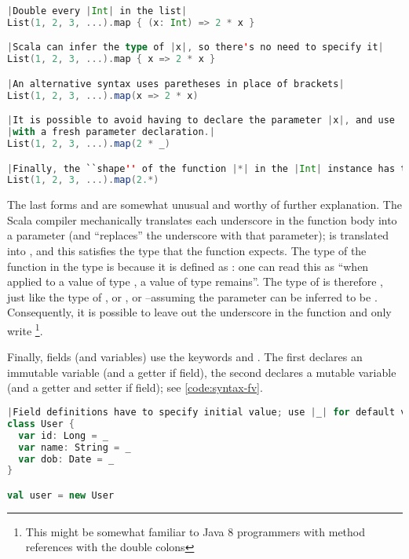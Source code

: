 \documentclass[10 pt]{article}
\begin{document}
\begin{lstlisting}[caption={Fields \& variables}, label={code:syntax-fun}, language=Scala, escapechar=|]
|Double every |Int| in the list|
List(1, 2, 3, ...).map { (x: Int) => 2 * x }

|Scala can infer the type of |x|, so there's no need to specify it|
List(1, 2, 3, ...).map { x => 2 * x }

|An alternative syntax uses paretheses in place of brackets|
List(1, 2, 3, ...).map(x => 2 * x)

|It is possible to avoid having to declare the parameter |x|, and use |_| instead. Scala compiler replaces the every occurrence of |_
|with a fresh parameter declaration.|
List(1, 2, 3, ...).map(2 * _)

|Finally, the ``shape'' of the function |*| in the |Int| instance has the right type, so it can be used directly.|
List(1, 2, 3, ...).map(2.*)
\end{lstlisting}

The last forms  and  are somewhat unusual and worthy of further explanation. The Scala compiler mechanically translates each underscore in the function body into a parameter (and ``replaces'' the underscore with that parameter);  is translated into , and this satisfies the type that the  function expects. The type of the function \pcode{*} in the  type is  because it is defined as : one can read this as ``when applied to a value of type , a value of type  remains''. The type of  is therefore , just like the type of , or , or --assuming the parameter can be inferred to be . Consequently, it is possible to leave out the underscore in the  function and only write \footnote{This might be somewhat familiar to Java 8 programmers with method references with the double colons}.

Finally, fields (and variables) use the keywords  and . The first declares an immutable variable (and a getter if field), the second declares a mutable variable (and a getter and setter if field); see \autoref{code:syntax-fv}.

\begin{lstlisting}[caption={Fields \& variables}, label={code:syntax-fv}, language=Scala, escapechar=|]
|Field definitions have to specify initial value; use |_| for default value.|
class User {
  var id: Long = _
  var name: String = _
  var dob: Date = _
}

val user = new User
\end{lstlisting}
\end{document}
